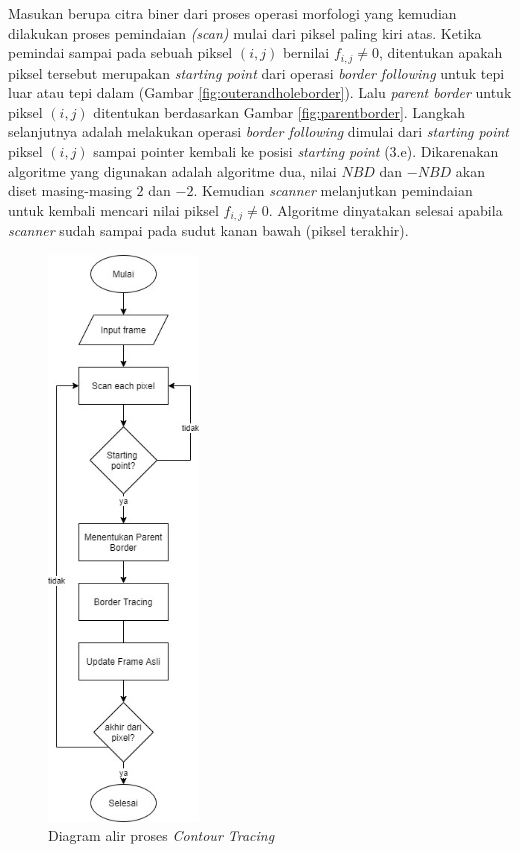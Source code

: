         Masukan berupa citra biner dari proses operasi morfologi yang kemudian dilakukan proses pemindaian \textit{(scan)} mulai dari piksel paling kiri atas. Ketika pemindai sampai pada sebuah piksel $(i, j)$ bernilai $f_{i, j} \neq 0$, ditentukan apakah piksel tersebut merupakan \textit{starting point} dari operasi \textit{border following} untuk tepi luar atau tepi dalam (Gambar \ref{fig:outerandholeborder}). Lalu \textit{parent border} untuk piksel $(i, j)$ ditentukan berdasarkan Gambar \ref{fig:parentborder}. Langkah selanjutnya adalah melakukan operasi \textit{border following} dimulai dari \textit{starting point} piksel $(i, j)$ sampai pointer kembali ke posisi \textit{starting point} (3.e). Dikarenakan algoritme yang digunakan adalah algoritme dua, nilai $NBD$ dan $-NBD$ akan diset masing-masing $2$ dan $-2$. Kemudian \textit{scanner} melanjutkan pemindaian untuk kembali mencari nilai piksel $f_{i, j} \neq 0$. Algoritme dinyatakan selesai apabila \textit{scanner} sudah sampai pada sudut kanan bawah (piksel terakhir).
        \begin{figure}[H]
        \centering
          \singlespacing
          \captionsetup{justification=centering,margin=0.5cm}
          \includegraphics[width=4cm]{image/FlowChart-Countour.jpg}
          \caption{Diagram alir proses \textit{Contour Tracing}}
          \label{fig:countourtracingflowchart}
        \end{figure}
        
